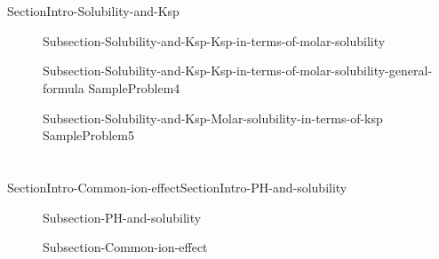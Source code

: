 \documentclass[main.tex]{subfiles}
\begin{document}
\section{}  {SectionIntro-Solubility-and-Ksp}
\sloppy\begin{description}
\item[]  {Subsection-Solubility-and-Ksp-Ksp-in-terms-of-molar-solubility}
\item[] {Subsection-Solubility-and-Ksp-Ksp-in-terms-of-molar-solubility-general-formula}
{SampleProblem4}
\item[] {Subsection-Solubility-and-Ksp-Molar-solubility-in-terms-of-ksp}
{SampleProblem5}
\end{description}



\section{\color{blue!30!black}{Solubility , PH and common ion effect}} {SectionIntro-Common-ion-effect}{SectionIntro-PH-and-solubility}
\sloppy\begin{description}
\item[] {Subsection-PH-and-solubility}
\item[]{Subsection-Common-ion-effect}
\end{description}
\end{document}
